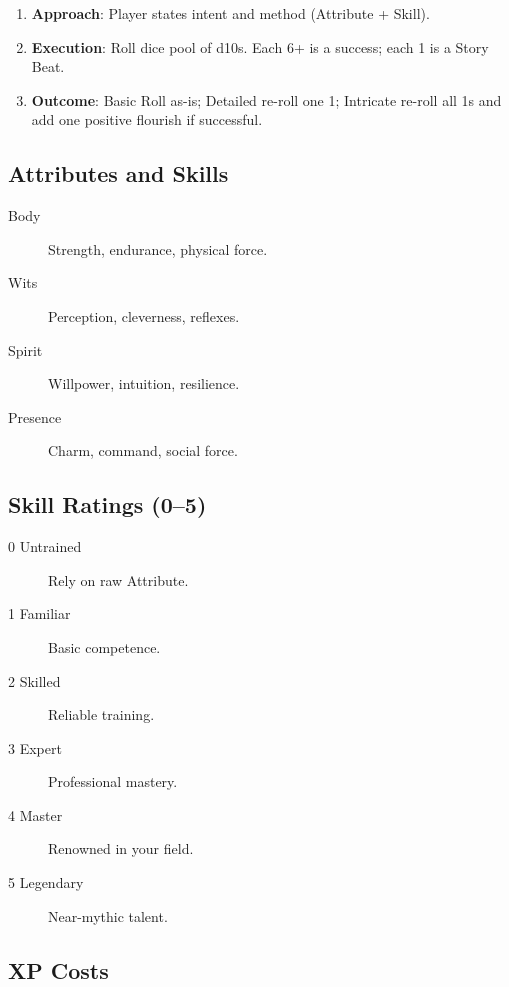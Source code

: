 \begin{enumerate}
\item \textbf{Approach}: Player states intent and method (Attribute + Skill).
\item \textbf{Execution}: Roll dice pool of d10s. Each 6+ is a success; each 1 is a Story Beat.
\item \textbf{Outcome}: Basic Roll as-is; Detailed re-roll one 1; Intricate re-roll all 1s and add one positive flourish if successful.
\end{enumerate}

\subsection{Attributes and Skills}

\begin{description}
\item[Body] Strength, endurance, physical force.
\item[Wits] Perception, cleverness, reflexes.
\item[Spirit] Willpower, intuition, resilience.
\item[Presence] Charm, command, social force.
\end{description}

\subsection{Skill Ratings (0--5)}

\begin{description}
\item[0 Untrained] Rely on raw Attribute.
\item[1 Familiar] Basic competence.
\item[2 Skilled] Reliable training.
\item[3 Expert] Professional mastery.
\item[4 Master] Renowned in your field.
\item[5 Legendary] Near-mythic talent.
\end{description}

\subsection{XP Costs}

